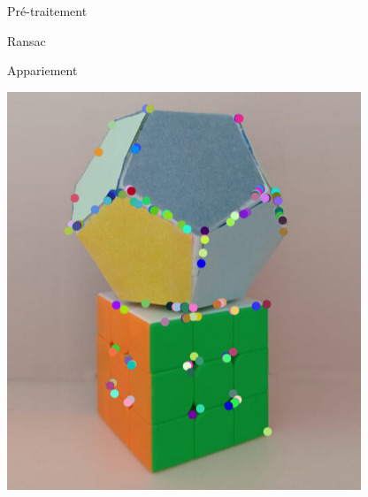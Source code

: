 \begin{frame}{Pré-traitement}
\begin{center}
\begin{minipage}{0.32\textwidth}
{        \centering\scriptsize Ransac
        \hyperlink{ransac-appendix}{
  }}

    \end{minipage}
    \end{center}

\end{frame}

\begin{frame}{Appariement}
  \begin{minipage}{0.48\linewidth}
    \includegraphics[width=\linewidth]{capture/test_detection_3_ransac_1000_6_5.jpeg}  
  \end{minipage}
  \hfill
    \begin{minipage}{0.48\linewidth}

\end{minipage}
\end{frame}
